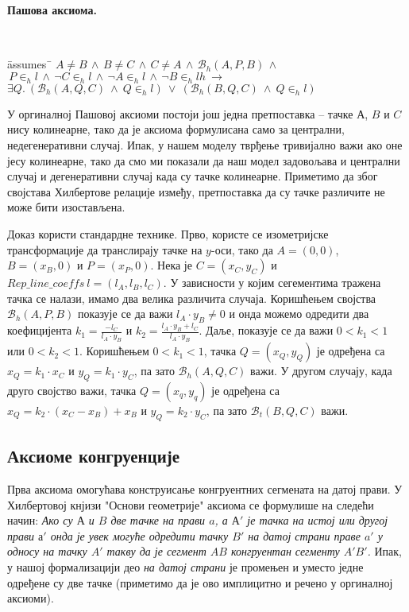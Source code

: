 \documentclass[a4paper, 12pt]{article}
\newcommand{\bett}[3]{\ensuremath{\mathcal{B}_t(#1, #2, #3)}}
\newcommand{\inh}[2]{\ensuremath{#1 \in_h #2}}
\renewcommand{\beth}[3]{\ensuremath{\mathcal{B}_h(#1, #2, #3)}}
\begin{document}
\paragraph{Пашова аксиома.}

{\tt
\begin{tabbing}
\hspace{5mm}\=assumes\ \=\kill
$A \neq B\,\wedge\,B \neq C\,\wedge\,C \neq A\,\wedge\,\beth{A}{P}{B}\,\wedge$\\
$\,\inh{P}{l}\,\wedge\,\neg \inh{C}{l}\,\wedge\,\neg \inh{A}{l}\,\wedge\,\neg \inh{B}{l}h\ \longrightarrow$\\
\>$\exists Q.\ (\beth{A}{Q}{C}\  \wedge\ \inh{Q}{l})\ \vee\
               (\beth{B}{Q}{C}\  \wedge\  \inh{Q}{l})$
\end{tabbing}
}

\begin{center}

\end{center}

У оргиналној Пашовој аксиоми постоји још једна претпоставка -- тачке
$А$, $B$ и $C$ нису колинеарне, тако да је аксиома формулисана само за
централни, недегенеративни случај. Ипак, у нашем моделу тврђење
тривијално важи ако оне јесу колинеарне, тако да смо ми показали да
наш модел задовољава и централни случај и дегенеративни случај када су
тачке колинеарне. Приметимо да због својстава Хилбертове релације
између, претпоставка да су тачке различите не може бити изостављена.

Доказ користи стандардне технике. Прво, користе се изометријске
трансформације да транслирају тачке на $y$-оси, тако да $A = (0, 0)$,
$B = (x_B, 0)$ и $P = (x_P, 0)$. Нека је $C = (x_C, y_C)$ и
$\mathit{Rep\_line\_coeffs}\ l = (l_A, l_B, l_C)$. У зависности у
којим сегементима тражена тачка се налази, имамо два велика различита
случаја. Коришћењем својства $\beth{A}{P}{B}$ показује се да важи
$l_A\cdot y_B \neq 0$ и онда можемо одредити два коефицијента $k_1 =
\frac{-l_C}{l_A\cdot y_B}$ и $k_2 = \frac{l_A\cdot y_B + l_C}{l_A\cdot
  y_B}$.  Даље, показује се да важи $0 < k_1 < 1$ или $0 < k_2 <
1$. Коришћењем $0 < k_1 < 1$, тачка $Q = (x_Q, y_Q)$ је одређена са
$x_Q = k_1\cdot x_C$ и $y_Q = k_1\cdot y_C$, па зато $\beth{A}{Q}{C}$
важи. У другом случају, када друго својство важи, тачка $Q=(x_q, y_q)$
је одређена са $x_Q = k_2\cdot (x_C - x_B) + x_B$ и $y_Q = k_2\cdot
y_C$, па зато $\bett{B}{Q}{C}$ важи.

\subsection{Аксиоме конгруенције}
Прва аксиома омогућава конструисање конгруентних сегмената на датој
прави. У Хилбертовој кнјизи "Основи геометрије" \cite{hilbert} аксиома
се формулише на следећи начин: \emph{Ако су $А$ и $B$ две тачке на
  прави $a$, а $А'$ је тачка на истој или другој прави $а'$ онда је
  увек могуће одредити тачку $B'$ на датој страни праве $a'$ у односу
  на тачку $A'$ такву да је сегмент $AB$ конгруентан сегменту $A'B'$.}
Ипак, у нашој формализацији део \emph{на датој страни} је промењен и
уместо једне одређене су две тачке (приметимо да је ово имплицитно и
речено у оргиналној аксиоми).
\end{document}
